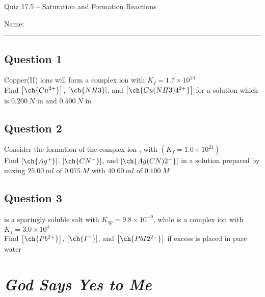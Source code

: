 \documentclass[11pt, letterpaper]{memoir}
\begin{document}
	\begin{center}
		{\large	Quiz 17.5 -- Saturation and Formation Reactions}
	\end{center}
	{\large Name: \rule[-1mm]{4in}{.1pt} 

\subsection*{Question 1}
Copper(II) ions will form a  complex ion with $K_f=1.7\times10^{13}$\\
Find $\left[\ch{Cu^{2+}}\right]$, $\left[\ch{NH3}\right]$, and $\left[\ch{Cu(NH3)4^{2+}}\right]$ for a solution which is $0.200~N$ in  and $0.500~N$ in 

\vspace{8em}
\subsection*{Question 2}
Consider the formation of the complex ion , with $\left( K_f=1.0\times10^{21}\right)$ \\Find $\left[\ch{Ag^+}\right]$, $\left[\ch{CN^-}\right]$, and $\left[\ch{Ag(CN)2^-}\right]$ in a solution prepared by mixing $25.00~ml$ of $0.075~M$  with $40.00~ml$ of $0.100~M$ 

\vspace{10em}
\subsection*{Question 3}
 is a sparingly soluble salt with $K_{sp}=9.8\times10^{-9}$, while  is a complex ion with $K_f=3.0\times10^4$\\
Find $\left[\ch{Pb^{2+}}\right]$, $\left[\ch{I^-}\right]$, and $\left[\ch{PbI2^{2-}}\right]$ if excess  is placed in pure water
	\newpage
	\pagestyle{empty}
	\addtocounter{page}{-1}
\section*{\emph{God Says Yes to Me}}
}
\end{document}
